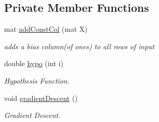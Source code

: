 \subsection*{Private Member Functions}
\begin{DoxyCompactItemize}
\item 
\mbox{\label{classLinearClassifier_a1f6483538d5096759af9716f04f66091}} 
mat \hyperlink{classLinearClassifier_a1f6483538d5096759af9716f04f66091}{add\+Const\+Col} (mat X)
\begin{DoxyCompactList}\small\item\em adds a bias column(of ones) to all rows of input \end{DoxyCompactList}\item 
\mbox{\label{classLinearClassifier_a5fe43dd6d56439cf4054e70dc5be045a}} 
double \hyperlink{classLinearClassifier_a5fe43dd6d56439cf4054e70dc5be045a}{hypo} (int i)
\begin{DoxyCompactList}\small\item\em Hypothesis Function. \end{DoxyCompactList}\item 
\mbox{\label{classLinearClassifier_a9996154d71ca96b03b7eb24aa606a377}} 
void \hyperlink{classLinearClassifier_a9996154d71ca96b03b7eb24aa606a377}{gradient\+Descent} ()
\begin{DoxyCompactList}\small\item\em Gradient Descent. \end{DoxyCompactList}\end{DoxyCompactItemize}
